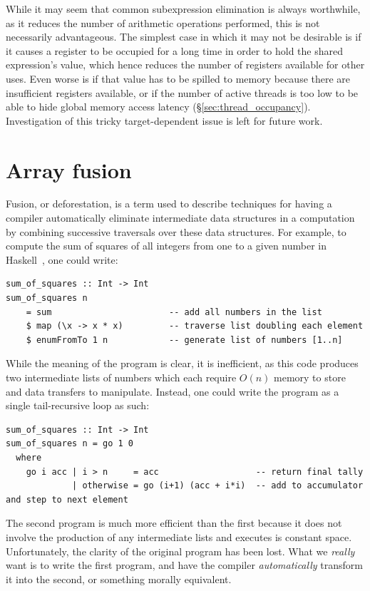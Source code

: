 While it may seem that common subexpression elimination is always worthwhile, as
it reduces the number of arithmetic operations performed, this is not
necessarily advantageous. The simplest case in which it may not be desirable is
if it causes a register to be occupied for a long time in order to hold the
shared expression's value, which hence reduces the number of registers available
for other uses. Even worse is if that value has to be spilled to memory because
there are insufficient registers available, or if the number of active threads
is too low to be able to hide global memory access latency
(\S\ref{sec:thread_occupancy}). Investigation of this tricky target-dependent
issue is left for future work.


\section{Array fusion}
\label{sec:array_fusion}

Fusion, or deforestation, is a term used to describe techniques for having a
compiler automatically eliminate intermediate data structures in a computation
by combining successive traversals over these data structures. For example, to
compute the sum of squares of all integers from one to a given number in
Haskell~\cite{Haskell:1998}, one could write:
%
\begin{lstlisting}[style=haskell]
sum_of_squares :: Int -> Int
sum_of_squares n
    = sum                       -- add all numbers in the list
    $ map (\x -> x * x)         -- traverse list doubling each element
    $ enumFromTo 1 n            -- generate list of numbers [1..n]
\end{lstlisting}
%
While the meaning of the program is clear, it is inefficient, as this code
produces two intermediate lists of numbers which each require $O(n)$ memory to
store and data transfers to manipulate. Instead, one could write the program
as a single tail-recursive loop as such:
%
\begin{lstlisting}[style=haskell]
sum_of_squares :: Int -> Int
sum_of_squares n = go 1 0
  where
    go i acc | i > n     = acc                   -- return final tally
             | otherwise = go (i+1) (acc + i*i)  -- add to accumulator and step to next element
\end{lstlisting}
%
The second program is much more efficient than the first because it does not
involve the production of any intermediate lists and executes is constant space.
Unfortunately, the clarity of the original program has been lost. What we
\emph{really} want is to write the first program, and have the compiler
\emph{automatically} transform it into the second, or something morally
equivalent.

